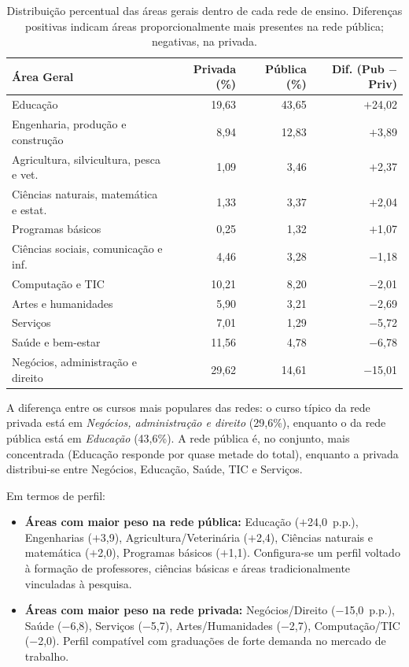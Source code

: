 \documentclass[12pt]{article}
\begin{document}
\begin{table}[h]
\centering
\small
\begin{tabular}{lrrr}
\toprule
Área Geral & Privada (\%) & Pública (\%) & Dif. (Pub $-$ Priv) \\
\midrule
Educação & 19,63 & 43,65 & $+$24,02 \\
Engenharia, produção e construção & 8,94 & 12,83 & $+$3,89 \\
Agricultura, silvicultura, pesca e vet. & 1,09 & 3,46 & $+$2,37 \\
Ciências naturais, matemática e estat. & 1,33 & 3,37 & $+$2,04 \\
Programas básicos & 0,25 & 1,32 & $+$1,07 \\
Ciências sociais, comunicação e inf. & 4,46 & 3,28 & $-$1,18 \\
Computação e TIC & 10,21 & 8,20 & $-$2,01 \\
Artes e humanidades & 5,90 & 3,21 & $-$2,69 \\
Serviços & 7,01 & 1,29 & $-$5,72 \\
Saúde e bem-estar & 11,56 & 4,78 & $-$6,78 \\
Negócios, administração e direito & 29,62 & 14,61 & $-$15,01 \\
\bottomrule
\end{tabular}
\caption{Distribuição percentual das áreas gerais dentro de cada rede de ensino. Diferenças positivas indicam áreas proporcionalmente mais presentes na rede pública; negativas, na privada.}
\label{tab:area-rede}
\end{table}

A diferença entre os cursos mais populares das redes: o curso típico da rede privada está em \textit{Negócios, administração e direito} (29,6\%), enquanto o da rede pública está em \textit{Educação} (43,6\%). A rede pública é, no conjunto, mais concentrada (Educação responde por quase metade do total), enquanto a privada distribui-se entre Negócios, Educação, Saúde, TIC e Serviços.

Em termos de perfil:
\begin{itemize}
    \item \textbf{Áreas com maior peso na rede pública:} Educação ($+$24,0~p.p.), Engenharias ($+$3,9), Agricultura/Veterinária ($+$2,4), Ciências naturais e matemática ($+$2,0), Programas básicos ($+$1,1). Configura-se um perfil voltado à formação de professores, ciências básicas e áreas tradicionalmente vinculadas à pesquisa.
    \item \textbf{Áreas com maior peso na rede privada:} Negócios/Direito ($-$15,0~p.p.), Saúde ($-$6,8), Serviços ($-$5,7), Artes/Humanidades ($-$2,7), Computação/TIC ($-$2,0). Perfil compatível com graduações de forte demanda no mercado de trabalho.
\end{itemize}
\end{document}
